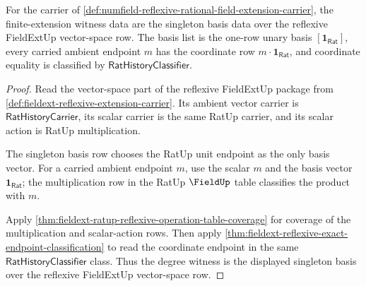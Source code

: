 \begin{theorem}
\label{thm:numfield-reflexive-rational-finite-extension-witness}
For the carrier of
\autoref{def:numfield-reflexive-rational-field-extension-carrier}, the
finite-extension witness data are the singleton basis data over the reflexive
FieldExtUp vector-space row. The basis list is the one-row unary basis
$[\mathbf{1}_{\mathsf{Rat}}]$, every carried ambient endpoint $m$ has the
coordinate row $m\cdot\mathbf{1}_{\mathsf{Rat}}$, and coordinate equality is
classified by $\mathsf{RatHistoryClassifier}$.
\end{theorem}
\begin{proof}
Read the vector-space part of the reflexive FieldExtUp package from
\autoref{def:fieldext-reflexive-extension-carrier}. Its ambient vector carrier
is $\mathsf{RatHistoryCarrier}$, its scalar carrier is the same RatUp carrier,
and its scalar action is RatUp multiplication.

The singleton basis row chooses the RatUp unit endpoint as the only basis
vector. For a carried ambient endpoint $m$, use the scalar $m$ and the basis
vector $\mathbf{1}_{\mathsf{Rat}}$; the multiplication row in the RatUp
$\FieldUp$ table classifies the product with $m$.

Apply
\autoref{thm:fieldext-ratup-reflexive-operation-table-coverage} for coverage of
the multiplication and scalar-action rows. Then apply
\autoref{thm:fieldext-reflexive-exact-endpoint-classification} to read the
coordinate endpoint in the same $\mathsf{RatHistoryClassifier}$ class. Thus
the degree witness is the displayed singleton basis over the reflexive
FieldExtUp vector-space row.
\end{proof}

